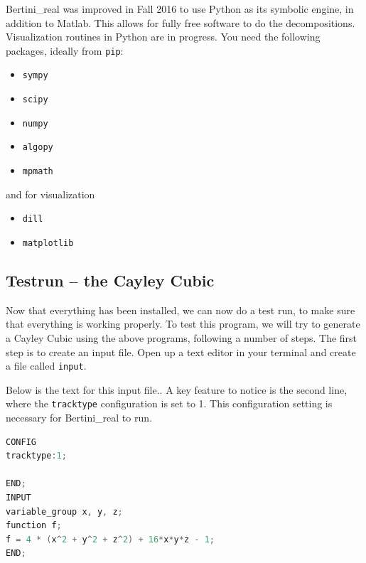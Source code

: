 Bertini\_real was improved in Fall 2016 to use Python as its symbolic engine, in addition to Matlab.  This allows for fully free software to do the decompositions.  Visualization routines in Python are in progress.  You need the following packages, ideally from {\tt pip}:
\begin{itemize}[noitemsep]
\item {\tt sympy}
\item {\tt scipy}
\item {\tt numpy}
\item {\tt algopy}
\item {\tt mpmath}
  \end{itemize}
and for visualization
\begin{itemize}[noitemsep]
\item {\tt dill}
\item {\tt matplotlib}
  \end{itemize}
























\clearpage

\subsection{Testrun -- the Cayley Cubic}

Now that everything has been installed, we can now do a test run, to make sure that everything is working properly. To test this program, we will try to generate a Cayley Cubic using the above programs, following a number of steps. The first step is to create an input file. Open up a text editor in your terminal and create a file called \texttt{input}. 

Below is the text for this input file.. A key feature to notice is the second line, where the \texttt{tracktype} configuration is set to 1. This configuration setting is necessary for Bertini\_real to run. 

\begin{center}\begin{minipage}{0.9\linewidth}
\begin{lstlisting}[language=c++, caption={\tt input} for the Cayley Cubic, captionpos=b]
CONFIG 
tracktype:1;

END;
INPUT
variable_group x, y, z;
function f;
f = 4 * (x^2 + y^2 + z^2) + 16*x*y*z - 1;
END;
\end{lstlisting}
\end{minipage}\end{center}

